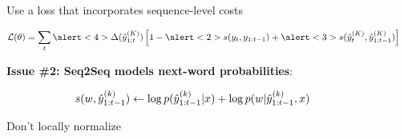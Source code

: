 \documentclass{beamer}
\let\tempone\itemize
\let\temptwo\enditemize
\renewenvironment{itemize}{\tempone\addtolength{\itemsep}{0.5\baselineskip}}{\temptwo}
\newcommand{\air}{\vspace{0.25cm}}
\newcommand{\niceq}{\ensuremath{\,{=}\,}}
\begin{document}
\begin{frame}
  \begin{center}
    \textbf{} Use a loss that incorporates sequence-level
    costs
  \end{center}
\begin{align*}
 \mathcal{L}&(\theta) = \sum_{t} \alert<4>{\Delta(\hat{y}_{1:t}^{(K)})} \left[1  - \alert<2>{s(y_t, y_{1:t-1})} +  \alert<3>{s(\hat{y}_t^{(K)}, \hat{y}_{1:t-1}^{(K)})} \right] 
\end{align*}

 
\end{frame}


\begin{frame}
  \begin{center}
    \textbf{\alert{Issue \#2}: Seq2Seq models next-word probabilities}:
  \end{center}
\air
\begin{align*}
\hspace*{-1cm} s(w, \hat{y}_{1:t-1}^{(k)}) \gets \log p(\hat{y}^{(k)}_{1:t-1}| x) + \log p( w | \hat{y}^{(k)}_{1:t-1}, x) 
\end{align*}


\air
\air
\air
\textbf{} Don't locally normalize
\end{frame}
\end{document}
